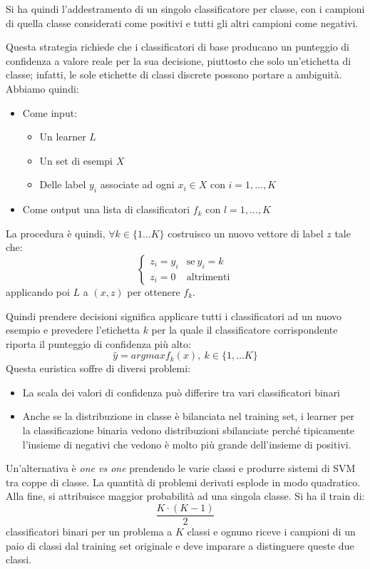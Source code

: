 Si ha quindi l'addestramento di un singolo classificatore per classe, con i campioni
di quella classe considerati come positivi e tutti gli altri campioni come negativi.

Questa strategia richiede che i classificatori di base producano un punteggio di
confidenza a valore reale per la sua decisione, piuttosto che solo un'etichetta
di classe; infatti, le sole etichette di classi discrete possono portare a ambiguità.
Abbiamo quindi:
\begin{itemize}
    \item Come input:
          \begin{itemize}
              \item Un learner $L$
              \item Un set di esempi $X$
              \item Delle label $y_i$ associate ad ogni $x_i \in X$ con $i = 1, \dots, K$
          \end{itemize}
    \item Come output una lista di classificatori $f_k$ con $l = 1,\dots, K$
\end{itemize}
La procedura è quindi, $\forall k \in \{1 \dots K\}$ costruisco un nuovo vettore
di label $z$ tale che:
\begin{equation}
    \begin{cases}
        z_i = y_i & \text{se} \ y_i = k \\
        z_i = 0   & \text{altrimenti}
    \end{cases}
\end{equation}
applicando poi $L$ a $(x, z)$ per ottenere $f_k$.

Quindi prendere decisioni significa applicare tutti i classificatori ad un nuovo
esempio e prevedere l'etichetta $k$ per la quale il classificatore corrispondente
riporta il punteggio di confidenza più alto:
\begin{equation}
    \hat{y} = argmax f_k(x), \ k \in \{1,\dots K\}
\end{equation}
Questa euristica soffre di diversi problemi:
\begin{itemize}
    \item La scala dei valori di confidenza può differire tra vari classificatori
          binari
    \item Anche se la distribuzione in classe è bilanciata nel training set, i
          learner per la classificazione binaria vedono distribuzioni sbilanciate
          perché tipicamente l'insieme di negativi che vedono è molto più grande
          dell'insieme di positivi.
\end{itemize}
Un'alternativa è \textit{one vs one} prendendo le varie classi e produrre sistemi
di SVM tra coppe di classe. La quantità di problemi derivati esplode in modo
quadratico. Alla fine, si attribuisce maggior probabilità ad una singola classe.
Si ha il train di:
\begin{equation}
    \frac{K \cdot (K - 1)}{2}
\end{equation}
classificatori binari per un problema a $K$ classi e ognuno riceve i campioni di
un paio di classi dal training set originale e deve imparare a distinguere queste
due classi.

